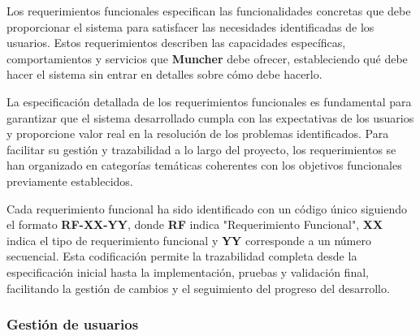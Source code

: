 Los requerimientos funcionales especifican las funcionalidades concretas que debe proporcionar el sistema para satisfacer las necesidades identificadas de los usuarios. Estos requerimientos describen las capacidades específicas, comportamientos y servicios que \textbf{Muncher} debe ofrecer, estableciendo qué debe hacer el sistema sin entrar en detalles sobre cómo debe hacerlo.

La especificación detallada de los requerimientos funcionales es fundamental para garantizar que el sistema desarrollado cumpla con las expectativas de los usuarios y proporcione valor real en la resolución de los problemas identificados. Para facilitar su gestión y trazabilidad a lo largo del proyecto, los requerimientos se han organizado en categorías temáticas coherentes con los objetivos funcionales previamente establecidos.

Cada requerimiento funcional ha sido identificado con un código único siguiendo el formato \textbf{RF-XX-YY}, donde \textbf{RF} indica "Requerimiento Funcional", \textbf{XX} indica el tipo de requerimiento funcional y \textbf{YY} corresponde a un número secuencial. Esta codificación permite la trazabilidad completa desde la especificación inicial hasta la implementación, pruebas y validación final, facilitando la gestión de cambios y el seguimiento del progreso del desarrollo.



\subsubsection*{Gestión de usuarios}





